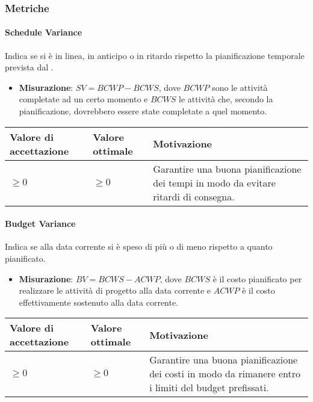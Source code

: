 \subsubsection{Metriche}

\paragraph{Schedule Variance}
Indica se si è in linea, in anticipo o in ritardo rispetto la pianificazione temporale prevista dal \PdP.
\begin{itemize}
\item \textbf{Misurazione}: $SV = BCWP - BCWS$, dove $BCWP$ sono le attività completate ad un certo momento e $BCWS$ le attività che, secondo la pianificazione, dovrebbero essere state completate a quel momento.
\end{itemize}

\begin{center}

		\begin{tabular}{|P{2.5cm}|P{2.5cm}|P{6cm}|}
		\hline
			\textbf{Valore di accettazione}	& \textbf{Valore ottimale} & \textbf{Motivazione} \\
			\hline
			$\geq 0$ & $\geq 0$ & Garantire una buona pianificazione dei tempi in modo da evitare ritardi di consegna. \\
			\hline
			\end{tabular}
\end{center}


\paragraph{Budget Variance}
Indica se alla data corrente si è speso di più o di meno rispetto a quanto pianificato.
\begin{itemize}
\item \textbf{Misurazione}: $BV = BCWS - ACWP$, dove $BCWS$ è il costo pianificato per realizzare le attività di progetto alla data corrente e $ACWP$ è il costo effettivamente sostenuto alla data corrente.
\end{itemize}

\begin{center}
	\begin{tabular}{|P{2.5cm}|P{2.5cm}|P{6cm}|}
		\hline
			\textbf{Valore di accettazione}	& \textbf{Valore ottimale} & \textbf{Motivazione} \\
			\hline
			$\geq 0$ & $\geq 0$ & Garantire una buona pianificazione dei costi in modo da rimanere entro i limiti del budget prefissati. \\
			\hline
			\end{tabular}
\end{center}

